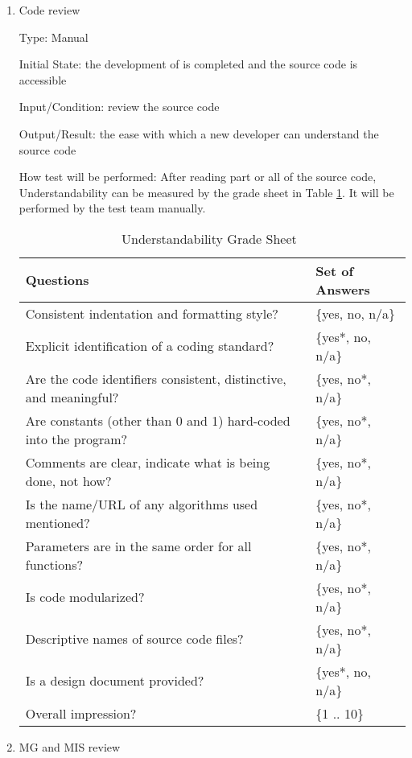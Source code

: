 \documentclass[12pt, titlepage]{article}
\begin{document}
\begin{enumerate}

\item{Code review}

Type: Manual
					
Initial State: the development of \progname{} is completed and the source code
is accessible
					
Input/Condition: review the source code
					
Output/Result: the ease with which a new developer can understand the source
code
					
How test will be performed: After reading part or all of the source code,
Understandability can be measured by the grade sheet in Table
\ref{Tb_understandable}. It will be performed by the test team manually.

\begin{table}[h]
\begin{tabular}{@{}ll@{}}
\toprule
Questions & Set of Answers \\ \midrule
Consistent indentation and formatting style? & \{yes, no, n/a\} \\
Explicit identification of a coding standard? & \{yes*, no, n/a\} \\
Are the code identifiers consistent, distinctive, and meaningful? & \{yes, no*,
n/a\} \\
Are constants (other than 0 and 1) hard-coded into the program? & \{yes, no*,
n/a\} \\
Comments are clear, indicate what is being done, not how? & \{yes, no*, n/a\}
\\Is the name/URL of any algorithms used mentioned? & \{yes, no*, n/a\} \\
Parameters are in the same order for all functions? & \{yes, no*, n/a\} \\
Is code modularized? & \{yes, no*, n/a\} \\
Descriptive names of source code files? & \{yes, no*, n/a\} \\
Is a design document provided? & \{yes*, no, n/a\} \\
Overall impression? & \{1 .. 10\} \\ \bottomrule
\end{tabular}
\caption{Understandability Grade Sheet~\cite{SmithEtAl2018}}
\label{Tb_understandable}
\end{table}

\item{MG and MIS review}


\end{enumerate}
\end{document}
